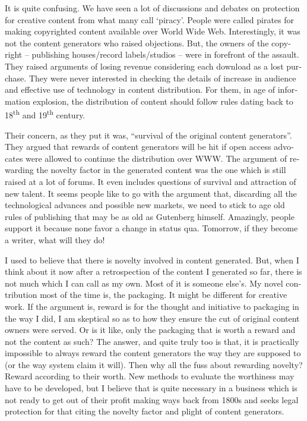 \begin{english}
It is quite confusing. We have seen a lot of discussions and debates on protection for creative content from what many call `piracy'. People were called pirates for making copyrighted content available over World Wide Web. Interestingly, it was not the content generators who raised objections. But, the owners of the copyright -- publishing houses/record labels/studios -- were in forefront of the assault. They raised arguments of losing revenue considering each download as a lost purchase. They were never interested in checking the details of increase in audience and effective use of technology in content distribution. For them, in age of information explosion, the distribution of content should follow rules dating back to 18\textsuperscript{th} and 19\textsuperscript{th} century. 

Their concern, as they put it was, ``survival of the original content generators''. They argued that rewards of content generators will be hit if open access advocates were allowed to continue the distribution over WWW. The argument of rewarding the novelty factor in the generated content was the one which is still raised at a lot of forums. It even includes questions of survival and attraction of new talent. It seems people like to go with the argument that, discarding all the technological advances and possible new markets, we need to stick to age old rules of publishing that may be as old as Gutenberg himself. Amazingly, people support it because none favor a change in status qua. Tomorrow, if they become a writer, what will they do!

I used to believe that there is novelty involved in content generated. But, when I think about it now after a retrospection of the content I generated so far, there is not much which I can call as my own. Most of it is someone else's. My novel contribution most of the time is, the packaging. It might be different for creative work. If the argument is, reward is for the thought and initiative to packaging in the way I did, I am skeptical so as to how they ensure the cut of original content owners were served. Or is it like, only the packaging that is worth a reward and not the content as such? The answer, and quite truly too is that, it is practically impossible to always reward the content generators the way they are supposed to (or the way system claim it will). Then why all the fuss about rewarding novelty? Reward according to their worth. New methods to evaluate the worthiness may have to be developed, but I believe that is quite necessary in a business which is not ready to get out of their profit making ways back from 1800s and seeks legal protection for that citing the novelty factor and plight of content generators.   


\end{english}
